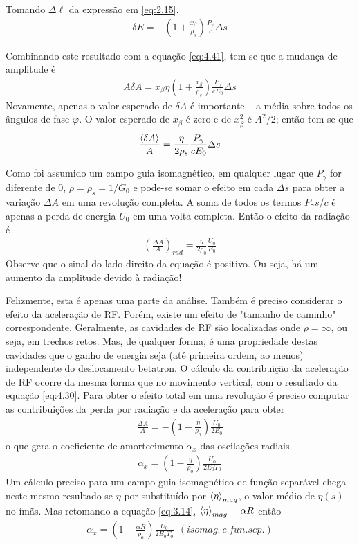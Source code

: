 Tomando $\Delta \ell$ da expressão em \eqref{eq:2.15},
\begin{align}
	\delta E = -\left(1+\frac{x_\beta}{\rho_s}\right)\frac{P_\gamma}{c}\Delta s
\end{align}

Combinando este resultado com a equação \eqref{eq:4.41}, tem-se que a mudança de amplitude é
\begin{align}
	A \delta A = x_\beta \eta \left(1+\frac{x_\beta}{\rho_s}\right)\frac{P_\gamma}{cE_0}\Delta s
\end{align}
Novamente, apenas o valor esperado de $\delta A$ é importante -- a média sobre todos os ângulos de fase $\varphi$. O valor esperado de $x_\beta$ é zero e de $x_\beta^2$ é $A^2/2$; então tem-se que
\begin{align}
	\frac{\left< \delta A \right>}{A} = \frac{\eta}{2 \rho_s}\frac{P_\gamma}{cE_0}\Delta s
\end{align}

Como foi assumido um campo guia isomagnético, em qualquer lugar que $P_\gamma$ for diferente de 0, $\rho = \rho_s = 1/G_0$ e pode-se somar o efeito em cada $\Delta s$ para obter a variação $\Delta A$ em uma revolução completa. A soma de todos os termos $P_\gamma s/c$ é apenas a perda de energia $U_0$ em uma volta completa. Então o efeito da radiação é
\begin{align}
	\left(\frac{\Delta A}{A}\right)_{rad} = \frac{\eta}{2 \rho_0}\frac{U_0}{E_0}
\end{align}
Observe que o sinal do lado direito da equação é positivo. Ou seja, há um aumento da amplitude devido à radiação!

Felizmente, esta é apenas uma parte da análise. Também é preciso considerar o efeito da aceleração de RF. Porém, existe um efeito de "tamanho de caminho" correspondente. Geralmente, as cavidades de RF são localizadas onde $\rho = \infty$, ou seja, em trechos retos. Mas, de qualquer forma, é uma propriedade destas cavidades que o ganho de energia seja (até primeira ordem, ao menos) independente do deslocamento betatron. O cálculo da contribuição da aceleração de RF ocorre da mesma forma que no movimento vertical, com o resultado da equação \eqref{eq:4.30}. Para obter o efeito total em uma revolução é preciso computar as contribuições da perda por radiação e da aceleração para obter
\begin{align}
	\frac{\Delta A}{A} = -\left(1-\frac{\eta}{\rho_0}\right)\frac{U_0}{2E_0}
\end{align}
o que gera o coeficiente de amortecimento $\alpha_x$ das oscilações radiais
\begin{align}
	\alpha_x = \left(1-\frac{\eta}{\rho_0}\right)\frac{U_0}{2E_0T_0}\label{eq:4.48}
\end{align}
Um cálculo preciso para um campo guia isomagnético de função separável chega neste mesmo resultado se $\eta$ por substituído por $\left< \eta \right>_{mag}$, o valor médio de $\eta(s)$ no ímãs. Mas retomando a equação \eqref{eq:3.14}, $\left< \eta \right>_{mag} = \alpha R$ então
\begin{align}
	\alpha_x = \left(1-\frac{\alpha R}{\rho_0}\right)\frac{U_0}{2E_0T_0}\ \ (isomag.\ e\ fun. sep.)\label{eq:4.49}
\end{align}

